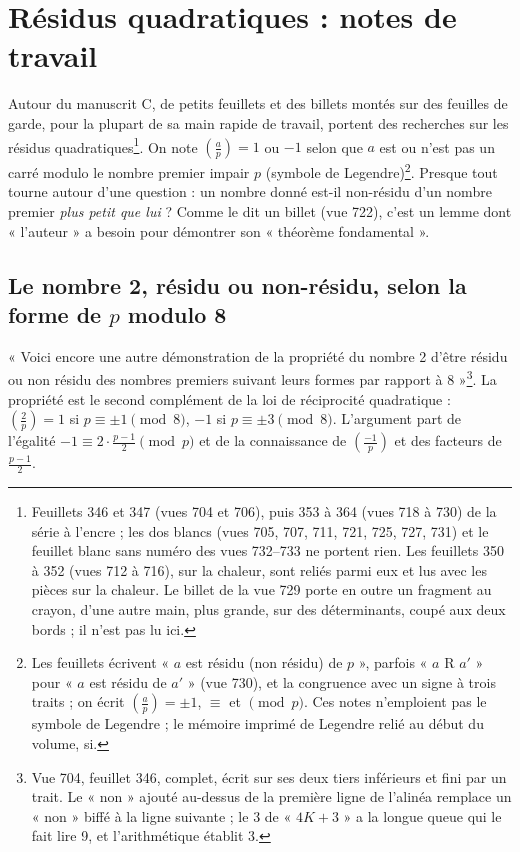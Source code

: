 \documentclass[11pt,a4paper]{article}
\begin{document}
\section*{Résidus quadratiques : notes de travail}

Autour du manuscrit C, de petits feuillets et des billets montés sur des feuilles de garde, pour la plupart de sa main rapide de travail, portent des recherches sur les résidus quadratiques\footnote{Feuillets 346 et 347 (vues 704 et 706), puis 353 à 364 (vues 718 à 730) de la série à l'encre ; les dos blancs (vues 705, 707, 711, 721, 725, 727, 731) et le feuillet blanc sans numéro des vues 732--733 ne portent rien. Les feuillets 350 à 352 (vues 712 à 716), sur la chaleur, sont reliés parmi eux et lus avec les pièces sur la chaleur. Le billet de la vue 729 porte en outre un fragment au crayon, d'une autre main, plus grande, sur des déterminants, coupé aux deux bords ; il n'est pas lu ici.}. On note $\left(\frac{a}{p}\right)=1$ ou $-1$ selon que $a$ est ou n'est pas un carré modulo le nombre premier impair $p$ (symbole de Legendre)\footnote{Les feuillets écrivent « $a$ est résidu (non résidu) de $p$ », parfois « $a$ R $a'$ » pour « $a$ est résidu de $a'$ » (vue 730), et la congruence avec un signe à trois traits ; on écrit $\left(\frac{a}{p}\right)=\pm1$, $\equiv$ et $\pmod p$. Ces notes n'emploient pas le symbole de Legendre ; le mémoire imprimé de Legendre relié au début du volume, si.}. Presque tout tourne autour d'une question : un nombre donné est-il non-résidu d'un nombre premier \emph{plus petit que lui} ? Comme le dit un billet (vue 722), c'est un lemme dont « l'auteur » a besoin pour démontrer son « théorème fondamental ».

\subsection*{Le nombre 2, résidu ou non-résidu, selon la forme de $p$ modulo 8}

« Voici encore une autre démonstration de la propriété du nombre 2 d'être résidu ou non résidu des nombres premiers suivant leurs formes par rapport à 8 »\footnote{Vue 704, feuillet 346, complet, écrit sur ses deux tiers inférieurs et fini par un trait. Le « non » ajouté au-dessus de la première ligne de l'alinéa remplace un « non » biffé à la ligne suivante ; le 3 de « $4K+3$ » a la longue queue qui le fait lire 9, et l'arithmétique établit 3.}. La propriété est le second complément de la loi de réciprocité quadratique : $\left(\frac{2}{p}\right)=1$ si $p\equiv\pm1\pmod 8$, $-1$ si $p\equiv\pm3\pmod 8$. L'argument part de l'égalité $-1\equiv 2\cdot\frac{p-1}{2}\pmod p$ et de la connaissance de $\left(\frac{-1}{p}\right)$ et des facteurs de $\frac{p-1}{2}$.
\end{document}
